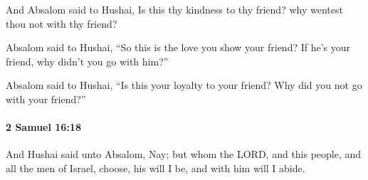 			\begin{versebox}
					\item[BHS] 
					\item[ASV] And Absalom said to Hushai, Is this thy kindness to thy friend? why wentest thou not with thy friend?
					\item[NIV] Absalom said to Hushai, “So this is the love you show your friend? If he’s your friend, why didn’t you go with him?”
					\item[NRSV] Absalom said to Hushai, “Is this your loyalty to your friend? Why did you not go with your friend?”
			\end{versebox}

		\paragraph{2 Samuel 16:18} %
			\label{2SAMUEL-16-18}

			And Hushai said unto Absalom, Nay; but whom the LORD, and this people, and all the men of Israel, choose, his will I be, and with him will I abide.

